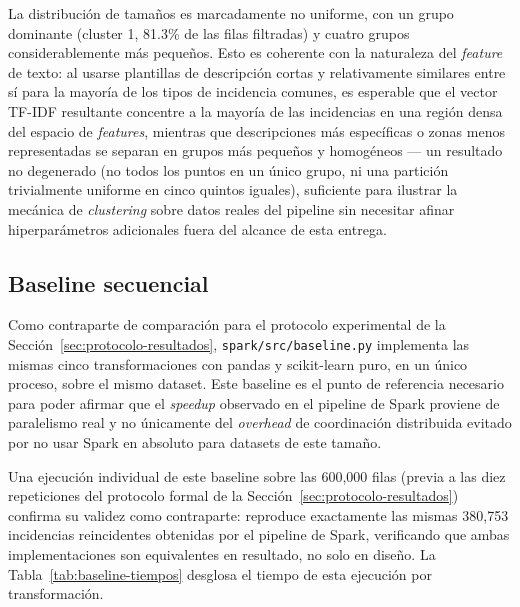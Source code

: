 La distribución de tamaños es marcadamente no uniforme, con un grupo dominante (cluster 1,
81.3\% de las filas filtradas) y cuatro grupos considerablemente más pequeños. Esto es coherente
con la naturaleza del \emph{feature} de texto: al usarse plantillas de descripción cortas y
relativamente similares entre sí para la mayoría de los tipos de incidencia comunes, es esperable
que el vector TF-IDF resultante concentre a la mayoría de las incidencias en una región densa del
espacio de \emph{features}, mientras que descripciones más específicas o zonas menos representadas
se separan en grupos más pequeños y homogéneos — un resultado no degenerado (no todos los puntos
en un único grupo, ni una partición trivialmente uniforme en cinco quintos iguales), suficiente
para ilustrar la mecánica de \emph{clustering} sobre datos reales del pipeline sin necesitar
afinar hiperparámetros adicionales fuera del alcance de esta entrega.

\subsection{Baseline secuencial}

Como contraparte de comparación para el protocolo experimental de la
Sección~\ref{sec:protocolo-resultados}, \texttt{spark/src/baseline.py} implementa las mismas cinco
transformaciones con pandas y scikit-learn puro, en un único proceso, sobre el mismo dataset. Este
baseline es el punto de referencia necesario para poder afirmar que el \emph{speedup} observado en
el pipeline de Spark proviene de paralelismo real y no únicamente del \emph{overhead} de
coordinación distribuida evitado por no usar Spark en absoluto para datasets de este tamaño.

Una ejecución individual de este baseline sobre las 600{,}000 filas (previa a las diez repeticiones
del protocolo formal de la Sección~\ref{sec:protocolo-resultados}) confirma su validez como
contraparte: reproduce exactamente las mismas 380{,}753 incidencias reincidentes obtenidas por el
pipeline de Spark, verificando que ambas implementaciones son equivalentes en resultado, no solo en
diseño. La Tabla~\ref{tab:baseline-tiempos} desglosa el tiempo de esta ejecución por transformación.

